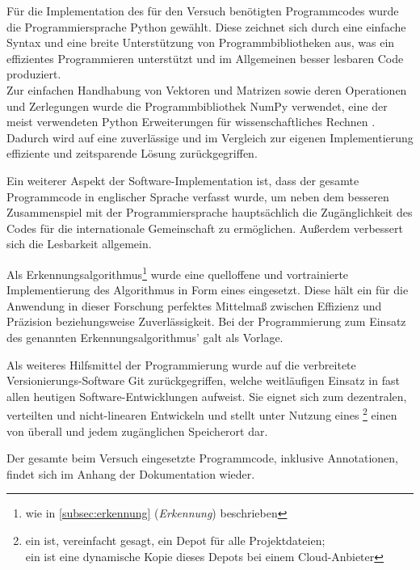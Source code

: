 Für die Implementation des für den Versuch benötigten Programmcodes wurde die Programmiersprache Python gewählt. Diese zeichnet sich durch eine einfache Syntax und eine breite Unterstützung von Programmbibliotheken aus, was ein effizientes Programmieren unterstützt und im Allgemeinen besser lesbaren Code produziert.\\
Zur einfachen Handhabung von Vektoren und Matrizen sowie deren Operationen und Zerlegungen wurde die Programmbibliothek NumPy \cite{numpy} verwendet, eine der meist verwendeten Python Erweiterungen für wissenschaftliches Rechnen \cite{numpy}. Dadurch wird auf eine zuverlässige und im Vergleich zur eigenen Implementierung effiziente und zeitsparende Lösung zurückgegriffen.\kleinerabstand

\noindent Ein weiterer Aspekt der Software-Implementation ist, dass der gesamte Programmcode in englischer Sprache verfasst wurde, um neben dem besseren Zusammenspiel mit der Programmiersprache hauptsächlich die Zugänglichkeit des Codes für die internationale Gemeinschaft zu ermöglichen. Außerdem verbessert sich die Lesbarkeit allgemein.\kleinerabstand

\noindent Als Erkennungsalgorithmus\footnote{wie in \ref{subsec:erkennung} (\emph{Erkennung}) beschrieben} wurde eine quelloffene und vortrainierte Implementierung \cite{mobilenetssd_github} des  Algorithmus \cite{ssd} in Form eines  \cite{mobilenet} eingesetzt. Diese hält ein für die Anwendung in dieser Forschung perfektes Mittelmaß zwischen Effizienz und Präzision beziehungsweise Zuverlässigkeit. Bei der Programmierung zum Einsatz des genannten Erkennungsalgorithmus' galt \cite{pyimagesearch} als Vorlage.\kleinerabstand

\noindent Als weiteres Hilfsmittel der Programmierung wurde auf die verbreitete Ver\-si\-o\-nie\-rungs-Software Git \cite{git} zurückgegriffen, welche weitläufigen Einsatz in fast allen heutigen Software-Entwicklungen aufweist. Sie eignet sich zum dezentralen, verteilten und nicht-linearen Entwickeln und stellt unter Nutzung eines \footnote{ ein  ist, vereinfacht gesagt, ein Depot für alle Projektdateien;\\ein {} ist eine dynamische Kopie dieses Depots bei einem Cloud-Anbieter} einen von überall und jedem zugänglichen Speicherort dar.\kleinerabstand

\noindent Der gesamte beim Versuch eingesetzte Programmcode, inklusive Annotationen, findet sich im Anhang der Dokumentation wieder.
